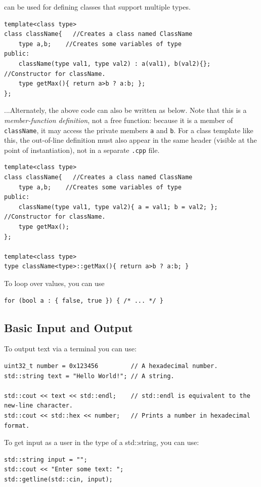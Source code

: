  can be used for defining classes that support multiple types. 
\begin{lstlisting}
template<class type>
class className{   //Creates a class named ClassName
	type a,b;    //Creates some variables of type
public:
	className(type val1, type val2) : a(val1), b(val2){};  //Constructor for className.
	type getMax(){ return a>b ? a:b; };
};
\end{lstlisting}
...Alternately, the above code can also be written as below. Note that this is a \textit{member-function definition}, not a free function: because it is a member of \texttt{className}, it may access the private members \texttt{a} and \texttt{b}. For a class template like this, the out-of-line definition must also appear in the same header (visible at the point of instantiation), not in a separate \texttt{.cpp} file.
\begin{lstlisting}
template<class type>
class className{   //Creates a class named ClassName
	type a,b;    //Creates some variables of type
public:
	className(type val1, type val2){ a = val1; b = val2; };  //Constructor for className.
	type getMax();
};

template<class type>
type className<type>::getMax(){ return a>b ? a:b; }
\end{lstlisting}

To loop over  values, you can use
\begin{lstlisting}
for (bool a : { false, true }) { /* ... */ }
\end{lstlisting}








\subsection{Basic Input and Output}
To output text via a terminal you can use:
\begin{lstlisting}
uint32_t number = 0x123456         // A hexadecimal number.
std::string text = "Hello World!"; // A string.

std::cout << text << std::endl;    // std::endl is equivalent to the new-line character.
std::cout << std::hex << number;   // Prints a number in hexadecimal format.
\end{lstlisting}

To get input as a user in the type of a std::string, you can use:
\begin{lstlisting}
std::string input = "";
std::cout << "Enter some text: ";
std::getline(std::cin, input);
\end{lstlisting}











